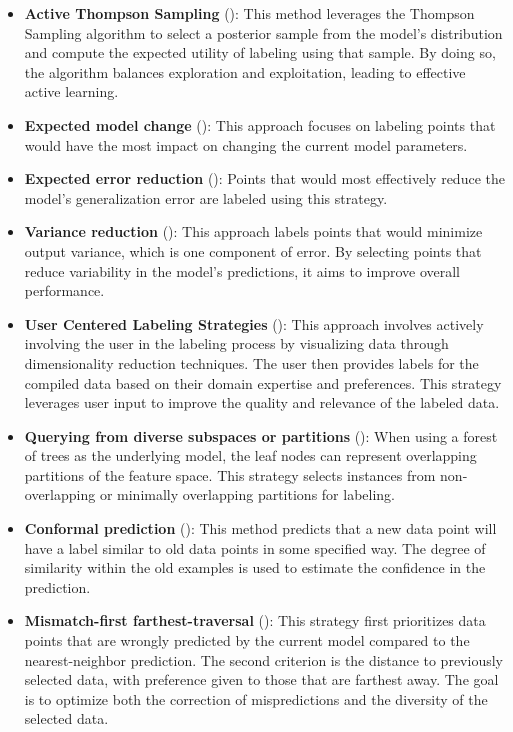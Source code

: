 \documentclass[
  letterpaper,
  numbers=noenddot,
  DIV=11]{scrreprt}
\theoremstyle{definition}
\theoremstyle{plain}
\theoremstyle{plain}
\theoremstyle{remark}
\begin{document}
\begin{itemize}
\item
  \textbf{Active Thompson Sampling}
  (): This
  method leverages the Thompson Sampling algorithm to select a posterior
  sample from the model's distribution and compute the expected utility
  of labeling using that sample. By doing so, the algorithm balances
  exploration and exploitation, leading to effective active learning.
\item
  \textbf{Expected model change} (): This approach focuses on labeling points that
  would have the most impact on changing the current model parameters.
\item
  \textbf{Expected error reduction}
  (): Points that
  would most effectively reduce the model's generalization error are
  labeled using this strategy.
\item
  \textbf{Variance reduction} (): This approach labels points that would
  minimize output variance, which is one component of error. By
  selecting points that reduce variability in the model's predictions,
  it aims to improve overall performance.
\item
  \textbf{User Centered Labeling Strategies}
  (): This approach
  involves actively involving the user in the labeling process by
  visualizing data through dimensionality reduction techniques. The user
  then provides labels for the compiled data based on their domain
  expertise and preferences. This strategy leverages user input to
  improve the quality and relevance of the labeled data.
\item
  \textbf{Querying from diverse subspaces or partitions}
  (): When using a forest of
  trees as the underlying model, the leaf nodes can represent
  overlapping partitions of the feature space. This strategy selects
  instances from non-overlapping or minimally overlapping partitions for
  labeling.
\item
  \textbf{Conformal prediction} (): This method predicts that a new
  data point will have a label similar to old data points in some
  specified way. The degree of similarity within the old examples is
  used to estimate the confidence in the prediction.
\item
  \textbf{Mismatch-first farthest-traversal}
  (): This
  strategy first prioritizes data points that are wrongly predicted by
  the current model compared to the nearest-neighbor prediction. The
  second criterion is the distance to previously selected data, with
  preference given to those that are farthest away. The goal is to
  optimize both the correction of mispredictions and the diversity of
  the selected data.
\end{itemize}
\end{document}

